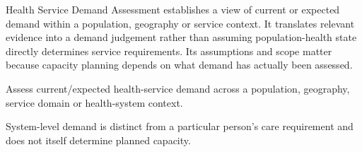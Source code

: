Health Service Demand Assessment establishes a view of current or expected demand within a population, geography or service context. It translates relevant evidence into a demand judgement rather than assuming population-health state directly determines service requirements. Its assumptions and scope matter because capacity planning depends on what demand has actually been assessed.



Assess current/\allowbreak{}expected health-service demand across a population, geography, service domain or health-system context.



System-level demand is distinct from a particular person's care requirement and does not itself determine planned capacity.


